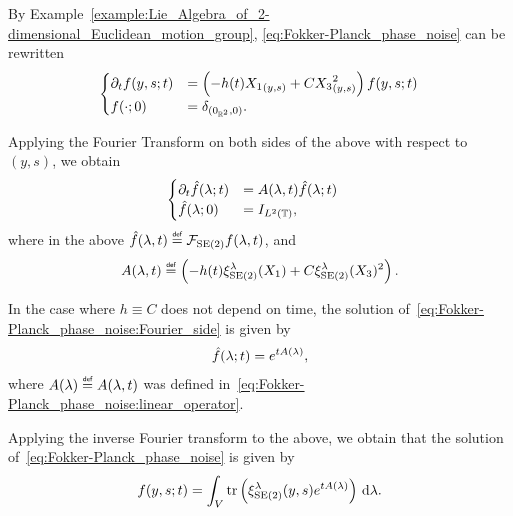 By Example~\ref{example:Lie_Algebra_of_2-dimensional_Euclidean_motion_group},
\eqref{eq:Fokker-Planck_phase_noise} can be rewritten
\begin{align}
    \begin{cases}
        \D{1}[f]{t}(y, s; t) &= \left(-h(t) \LeftDifferentialOperatorFirstOrder {X_1}_{(y, s)} + C \LeftDifferentialOperatorFirstOrder {X_3}^2_{(y, s)}\right) f(y, s; t)\\
        f(\dummy; 0) &= \DiracDelta{(0_{\R^2}, 0)}.
    \end{cases}
    \label{eq:Fokker-Planck_phase_noise:left-invariant_operators}
\end{align}

Applying the Fourier Transform on both sides of the above with respect to $(y, s)$,
we obtain
\begin{align}
    \begin{cases}
        \D{1}{t} \hat f(\lambda; t) &= A(\lambda, t) \hat f(\lambda; t)\\
        \hat f(\lambda; 0) &= \Id{\Lebesgue 2 \T},
    \end{cases}
    \quad
    \label{eq:Fokker-Planck_phase_noise:Fourier_side}
\end{align}
where in the above $\hat f(\lambda, t) \defeq \Fourier [\MotionGroup 2] f(\lambda, t)$, and
\begin{align}
    A(\lambda, t) \defeq \left( -h(t) \Rep [\MotionGroup 2] \lambda (X_1) + C \Rep [\MotionGroup 2] \lambda ({X_3})^2 \right).
    \label{eq:Fokker-Planck_phase_noise:linear_operator}
\end{align}

\begin{example}[$h \equiv C$]
    In the case where $h \equiv C$ does not depend on time,
    the solution of~\eqref{eq:Fokker-Planck_phase_noise:Fourier_side} is given by
    \begin{align*}
        \hat f(\lambda; t) = \e^{t A(\lambda)},
    \end{align*}
    where $A(\lambda) \defeq A(\lambda, t)$ was defined in~\eqref{eq:Fokker-Planck_phase_noise:linear_operator}.

    Applying the inverse Fourier transform to the above,
    we obtain that the solution of~\eqref{eq:Fokker-Planck_phase_noise} is given by
    \begin{align*}
        f(y, s; t) = \int_\VectorSpace \tr\left( \Rep [\MotionGroup 2] \lambda (y, s) \e^{t A(\lambda)} \right) \dd \lambda.
    \end{align*}
\end{example}


